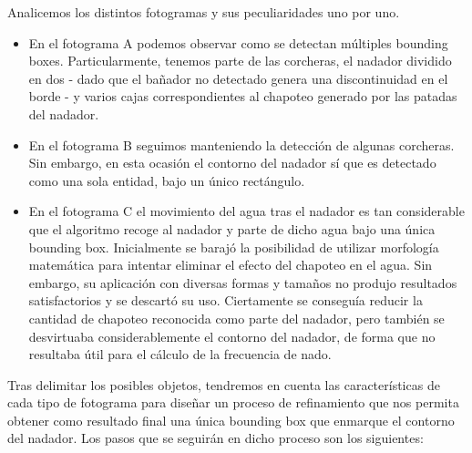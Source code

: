Analicemos los distintos fotogramas y sus peculiaridades uno por uno. 
\begin{itemize}
    \item En el fotograma A podemos observar como se detectan múltiples bounding boxes. Particularmente, tenemos parte de las corcheras, el nadador dividido en dos - dado que el bañador no detectado genera una discontinuidad en el borde - y varios cajas correspondientes al chapoteo generado por las patadas del nadador.
    \item En el fotograma B seguimos manteniendo la detección de algunas corcheras. Sin embargo, en esta ocasión el contorno del nadador sí que es detectado como una sola entidad, bajo un único rectángulo.
    \item En el fotograma C el movimiento del agua tras el nadador es tan considerable que el algoritmo recoge al nadador y parte de dicho agua  bajo una única bounding box. Inicialmente se barajó la posibilidad de utilizar morfología matemática para intentar eliminar el efecto del chapoteo en el agua. Sin embargo, su aplicación con diversas formas y tamaños no produjo resultados satisfactorios y se descartó su uso. Ciertamente se conseguía reducir la cantidad de chapoteo reconocida como parte del nadador, pero también se desvirtuaba considerablemente el contorno del nadador, de forma que no resultaba útil para el cálculo de la frecuencia de nado.
\end{itemize}

Tras delimitar los posibles objetos, tendremos en cuenta las características de cada tipo de fotograma para diseñar un proceso de refinamiento que nos permita obtener como resultado final una única bounding box que enmarque el contorno del nadador. Los pasos que se seguirán en dicho proceso son los siguientes:

